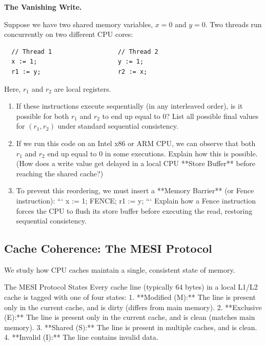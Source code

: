 \documentclass[12pt, a4paper]{book}
\begin{document}
\begin{puzzlebox}
\textbf{The Vanishing Write.}

Suppose we have two shared memory variables, $x = 0$ and $y = 0$.
Two threads run concurrently on two different CPU cores:
\begin{verbatim}
  // Thread 1                  // Thread 2
  x := 1;                      y := 1;
  r1 := y;                     r2 := x;
\end{verbatim}
Here, $r_1$ and $r_2$ are local registers.
\begin{enumerate}[label=(\alph*), leftmargin=*]
  \item If these instructions execute sequentially (in any interleaved order), is it possible for both $r_1$ and $r_2$ to end up equal to 0? List all possible final values for $(r_1, r_2)$ under standard sequential consistency.
  \item If we run this code on an Intel x86 or ARM CPU, we can observe that both $r_1$ and $r_2$ end up equal to 0 in some executions.
        Explain how this is possible. (How does a write value get delayed in a local CPU **Store Buffer** before reaching the shared cache?)
  \item To prevent this reordering, we must insert a **Memory Barrier** (or Fence instruction):
        ```
          x := 1;
          FENCE;
          r1 := y;
        ```
        Explain how a Fence instruction forces the CPU to flush its store buffer before executing the read, restoring sequential consistency.
\end{enumerate}
\end{puzzlebox}

\subsection{Cache Coherence: The MESI Protocol}

We study how CPU caches maintain a single, consistent state of memory.

\begin{namedconcept}{The MESI Protocol States}
Every cache line (typically 64 bytes) in a local L1/L2 cache is tagged with one of four states:
1. **Modified (M):** The line is present only in the current cache, and is dirty (differs from main memory).
2. **Exclusive (E):** The line is present only in the current cache, and is clean (matches main memory).
3. **Shared (S):** The line is present in multiple caches, and is clean.
4. **Invalid (I):** The line contains invalid data.
\end{namedconcept}
\end{document}

